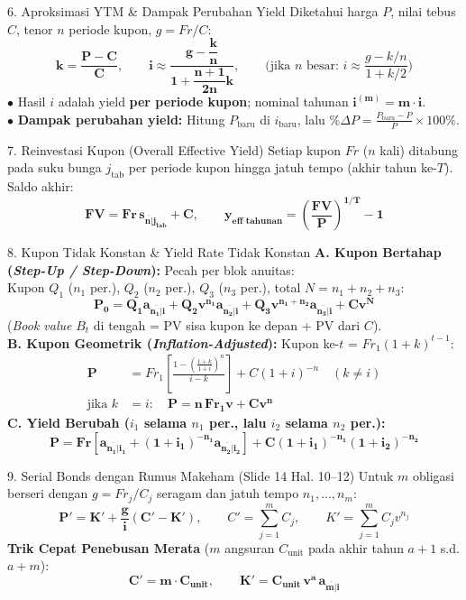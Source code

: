 \documentclass[10pt,a4paper,twocolumn]{article}
\newcommand{\angl}[1]{\overline{#1|}}
\begin{document}
\begin{cbox}{6. Aproksimasi YTM \& Dampak Perubahan Yield}
Diketahui harga $P$, nilai tebus $C$, tenor $n$ periode kupon, $g = Fr/C$:
\[
    \mathbf{k = \frac{P - C}{C}}, \qquad \mathbf{i \approx \frac{g - \dfrac{k}{n}}{1 + \dfrac{n+1}{2n}k}}, \qquad \text{(jika } n \text{ besar: } i \approx \frac{g - k/n}{1 + k/2}\text{)}
\]
$\bullet$ Hasil $i$ adalah yield \textbf{per periode kupon}; nominal tahunan $\mathbf{i^{(m)} = m \cdot i}$.\\
$\bullet$ \textbf{Dampak perubahan yield:} Hitung $P_{\text{baru}}$ di $i_{\text{baru}}$, lalu $\%\Delta P = \frac{P_{\text{baru}} - P}{P} \times 100\%$.
\end{cbox}

\begin{cbox}{7. Reinvestasi Kupon (Overall Effective Yield)}
Setiap kupon $Fr$ ($n$ kali) ditabung pada suku bunga $j_{\text{tab}}$ per periode kupon hingga jatuh tempo (akhir tahun ke-$T$). Saldo akhir:
\[
    \mathbf{FV = Fr \, s_{\angl{n}j_{\text{tab}}} + C}, \qquad \mathbf{y_{\text{eff tahunan}} = \left(\frac{FV}{P}\right)^{1/T} - 1}
\]
\end{cbox}

\begin{gbox}{8. Kupon Tidak Konstan \& Yield Rate Tidak Konstan}
\textbf{A. Kupon Bertahap (\textit{Step-Up / Step-Down}):} Pecah per blok anuitas:\\
Kupon $Q_1$ ($n_1$ per.), $Q_2$ ($n_2$ per.), $Q_3$ ($n_3$ per.), total $N = n_1+n_2+n_3$:
\[
    \mathbf{P_0 = Q_1 a_{\angl{n_1}i} + Q_2 v^{n_1} a_{\angl{n_2}i} + Q_3 v^{n_1+n_2} a_{\angl{n_3}i} + C v^N}
\]
(\textit{Book value} $B_t$ di tengah = PV sisa kupon ke depan + PV dari $C$).\\[1.5pt]
\textbf{B. Kupon Geometrik (\textit{Inflation-Adjusted}):} Kupon ke-$t$ = $Fr_1(1+k)^{t-1}$:
\begin{align*}
    \mathbf{P} &= Fr_1 \left[\frac{1 - \left(\tfrac{1+k}{1+i}\right)^n}{i - k}\right] + C(1+i)^{-n} \quad (k \neq i) \\
    \text{jika } k &= i:\quad \mathbf{P = n\,Fr_1 v + C v^n}
\end{align*}
\textbf{C. Yield Berubah ($i_1$ selama $n_1$ per., lalu $i_2$ selama $n_2$ per.):}
\[
    \mathbf{P = Fr \left[a_{\angl{n_1}i_1} + (1+i_1)^{-n_1} a_{\angl{n_2}i_2}\right] + C(1+i_1)^{-n_1}(1+i_2)^{-n_2}}
\]
\end{gbox}

\begin{gbox}{9. Serial Bonds dengan Rumus Makeham (Slide 14 Hal. 10--12)}
Untuk $m$ obligasi berseri dengan $g = Fr_j/C_j$ seragam dan jatuh tempo $n_1,\dots,n_m$:
\[
    \mathbf{P' = K' + \frac{g}{i}(C' - K')}, \qquad C' = \sum_{j=1}^m C_j, \qquad K' = \sum_{j=1}^m C_j v^{n_j}
\]
\textbf{Trik Cepat Penebusan Merata} ($m$ angsuran $C_{\text{unit}}$ pada akhir tahun $a+1$ s.d. $a+m$):
\[
    \mathbf{C' = m \cdot C_{\text{unit}}}, \qquad \mathbf{K' = C_{\text{unit}} \, v^a \, a_{\angl{m}i}}
\]
\end{gbox}
\end{document}
